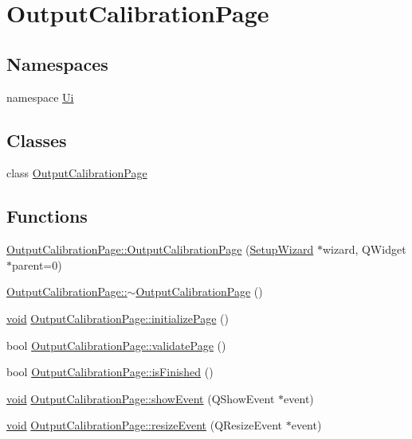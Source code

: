 \hypertarget{group___output_calibration_page}{\section{Output\-Calibration\-Page}
\label{group___output_calibration_page}
}
\subsection*{Namespaces}
\begin{DoxyCompactItemize}
\item 
namespace \hyperlink{namespace_ui}{Ui}
\end{DoxyCompactItemize}
\subsection*{Classes}
\begin{DoxyCompactItemize}
\item 
class \hyperlink{class_output_calibration_page}{Output\-Calibration\-Page}
\end{DoxyCompactItemize}
\subsection*{Functions}
\begin{DoxyCompactItemize}
\item 
\hyperlink{group___output_calibration_page_ga4975a50caf4226865af2d1d03e0fe82c}{Output\-Calibration\-Page\-::\-Output\-Calibration\-Page} (\hyperlink{class_setup_wizard}{Setup\-Wizard} $\ast$wizard, Q\-Widget $\ast$parent=0)
\item 
\hyperlink{group___output_calibration_page_ga4869b75d9c4a4506853c6901d70fa8cd}{Output\-Calibration\-Page\-::$\sim$\-Output\-Calibration\-Page} ()
\item 
\hyperlink{group___u_a_v_objects_plugin_ga444cf2ff3f0ecbe028adce838d373f5c}{void} \hyperlink{group___output_calibration_page_ga24bab144119d2bf977e40d7f33d16121}{Output\-Calibration\-Page\-::initialize\-Page} ()
\item 
bool \hyperlink{group___output_calibration_page_ga3e208c77155e8ab46a19849174aae3b6}{Output\-Calibration\-Page\-::validate\-Page} ()
\item 
bool \hyperlink{group___output_calibration_page_ga05fb534babe43fa9477a9d2ab14f5fbf}{Output\-Calibration\-Page\-::is\-Finished} ()
\item 
\hyperlink{group___u_a_v_objects_plugin_ga444cf2ff3f0ecbe028adce838d373f5c}{void} \hyperlink{group___output_calibration_page_gaccfd0563f0faafb93bacafa8cf873035}{Output\-Calibration\-Page\-::show\-Event} (Q\-Show\-Event $\ast$event)
\item 
\hyperlink{group___u_a_v_objects_plugin_ga444cf2ff3f0ecbe028adce838d373f5c}{void} \hyperlink{group___output_calibration_page_gafa4831a5e77c0a3a03ad4e5869d4d601}{Output\-Calibration\-Page\-::resize\-Event} (Q\-Resize\-Event $\ast$event)
\end{DoxyCompactItemize}
